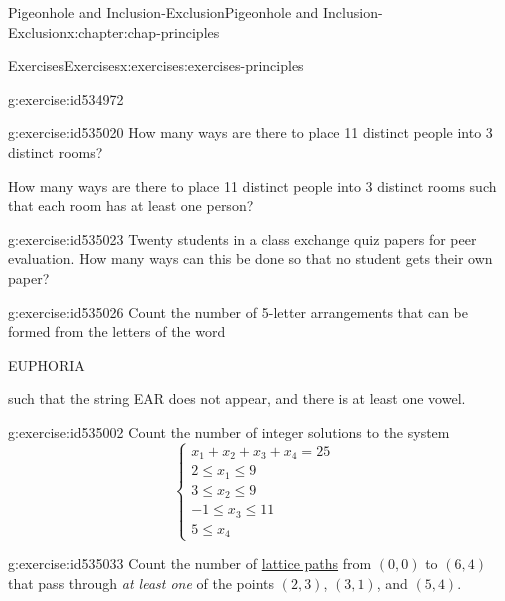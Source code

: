 \documentclass[oneside,10pt,]{book}
\numberwithin{equation}{section}
\newcommand{\amp}{&}
\begin{document}
\begin{chapterptx}{Pigeonhole and Inclusion-Exclusion}{}{Pigeonhole and Inclusion-Exclusion}{}{}{x:chapter:chap-principles}
\begin{exercises-section}{Exercises}{}{Exercises}{}{}{x:exercises:exercises-principles}
\begin{divisionexercise}{12}{}{}{g:exercise:id534972}
%
\end{divisionexercise}%
\begin{divisionexercise}{13}{}{}{g:exercise:id535020}%
How many ways are there to place 11 distinct people into 3 distinct rooms?%
\par
How many ways are there to place 11 distinct people into 3 distinct rooms such that each room has at least one person?%
\end{divisionexercise}%
\begin{divisionexercise}{14}{}{}{g:exercise:id535023}%
Twenty students in a class exchange quiz papers for peer evaluation. How many ways can this be done so that no student gets their own paper?%
\end{divisionexercise}%
\begin{divisionexercise}{15}{}{}{g:exercise:id535026}%
Count the number of 5-letter arrangements that can be formed from the letters of the word%
\begin{sidebyside}{1}{0.375}{0.375}{0}%
\begin{sbspanel}{0.25}%
EUPHORIA%
\end{sbspanel}%
\end{sidebyside}%
\par
such that the string EAR does not appear, and there is at least one vowel.%
\end{divisionexercise}%
\begin{divisionexercise}{16}{}{}{g:exercise:id535002}%
Count the number of integer solutions to the system%
\begin{equation*}
\begin{cases} x_1 + x_2 + x_3 + x_4 = 25 \amp \\ 
2 \leq x_1 \leq 9 \amp \\
3 \leq x_2 \leq 9 \amp \\
-1 \leq x_3 \leq 11 \amp \\
5 \leq x_4 \ \ \amp \end{cases}
\end{equation*}
%
\end{divisionexercise}%
\begin{divisionexercise}{17}{}{}{g:exercise:id535033}%
Count the number of \hyperref[x:example:eg-counting-lattice-path]{lattice paths} from \((0,0)\) to \((6,4)\) that pass through \emph{at least one} of the points \((2,3)\), \((3,1)\), and \((5,4)\).%
\begin{sidebyside}{1}{0.3}{0.3}{0}%
\begin{sbspanel}{0.4}%
\resizebox{\linewidth}{!}{%
\begin{tikzpicture}

\end{tikzpicture}}
\end{sbspanel}
\end{sidebyside}
\end{divisionexercise}
\end{exercises-section}
\end{chapterptx}
\end{document}
